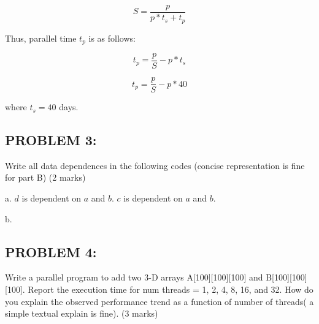 \documentclass[12pt,letterpaper]{article}
\begin{document}
\[ S = \frac{p}{p * t_{s} + t_{p}} \]

Thus, parallel time \(t_{p}\) is as follows:

\[ t_{p} = \frac{p}{S} - p * t_{s} \]

\[ t_{p} = \frac{p}{S} - p * 40 \]

where \(t_{s} = 40\) days.

\pagebreak


\subsection*{PROBLEM 3:}
Write all data dependences in the following codes (concise representation is fine for 
part B) (2 marks)

\hline

a. \(d\) is dependent on \(a\) and \(b\). \(c\) is dependent on \(a\) and \(b\).

b. 

\pagebreak


\subsection*{PROBLEM 4:}
Write a parallel program to add two 3-D arrays A[100][100][100] and B[100][100][100]. 
Report the execution time for num threads = 1, 2, 4, 8, 16, and 32. How do you explain 
the observed performance trend as a function of number of threads( a simple textual 
explain is fine). (3 marks)

\hline
\end{document}
